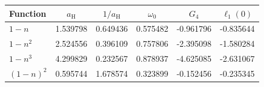 \begin{tabular}{lccccc}
\toprule
Function & $a_{\mathrm H}$ & $1/a_{\mathrm H}$ & $\omega_0$ & $G_4$ & $\ell_1(0)$ \\
\midrule
$1-n$ & 1.539798 & 0.649436 & 0.575482 & -0.961796 & -0.835644 \\
$1-n^2$ & 2.524556 & 0.396109 & 0.757806 & -2.395098 & -1.580284 \\
$1-n^3$ & 4.299829 & 0.232567 & 0.878937 & -4.625085 & -2.631067 \\
$(1-n)^2$ & 0.595744 & 1.678574 & 0.323899 & -0.152456 & -0.235345 \\
\bottomrule
\end{tabular}

